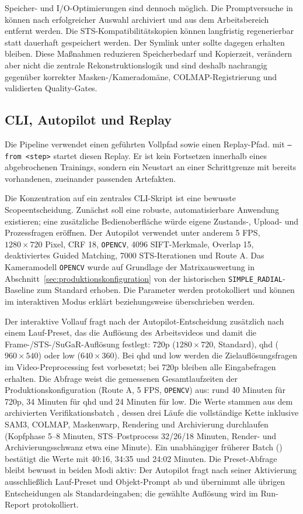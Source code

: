 Speicher- und I/O-Optimierungen sind dennoch möglich. Die Promptversuche in
 können nach erfolgreicher Auswahl archiviert und aus dem
Arbeitsbereich entfernt werden. Die STS-Kompatibilitätskopien können langfristig
regenerierbar statt dauerhaft gespeichert werden. Der Symlink unter
 sollte dagegen erhalten bleiben. Diese Maßnahmen
reduzieren Speicherbedarf und Kopierzeit, verändern aber nicht die zentrale
Rekonstruktionslogik und sind deshalb nachrangig gegenüber korrekter
Masken-/Kameradomäne, COLMAP-Registrierung und validierten Quality-Gates.

\subsection{CLI, Autopilot und Replay}

Die Pipeline verwendet einen geführten Vollpfad sowie einen Replay-Pfad.
 mit \texttt{--from <step>} startet diesen Replay. Er
ist kein Fortsetzen innerhalb eines abgebrochenen Trainings, sondern ein
Neustart an einer
Schrittgrenze mit bereits vorhandenen, zueinander passenden Artefakten.

Die Konzentration auf ein zentrales CLI-Skript ist eine bewusste
Scopeentscheidung. Zunächst soll eine robuste, automatisierbare Anwendung
existieren; eine zusätzliche Bedienoberfläche würde eigene Zustands-, Upload-
und Prozessfragen eröffnen. Der Autopilot verwendet unter anderem 5 FPS,
$1280\times720$ Pixel, CRF 18, \texttt{OPENCV}, 4096 SIFT-Merkmale,
Overlap 15, deaktiviertes Guided Matching, 7000 STS-Iterationen und Route A.
Das Kameramodell \texttt{OPENCV} wurde auf Grundlage der Matrixauswertung in
Abschnitt~\ref{sec:produktionskonfiguration} von der historischen
\texttt{SIMPLE\_RADIAL}-Baseline zum Standard erhoben. Die Parameter werden
protokolliert und können im interaktiven Modus erklärt beziehungsweise
überschrieben werden.

Der interaktive Vollauf fragt nach der Autopilot-Entscheidung zusätzlich nach
einem Lauf-Preset, das die Auflösung des Arbeitsvideos und damit die
Frame-/STS-/SuGaR-Auflösung festlegt: 720p ($1280\times720$, Standard),
qhd ($960\times540$) oder low ($640\times360$). Bei qhd und low werden die
Zielauflösungsfragen im Video-Preprocessing fest vorbesetzt; bei 720p bleiben
alle Eingabefragen erhalten. Die Abfrage weist die gemessenen Gesamtlaufzeiten
der Produktionskonfiguration (Route A, 5 FPS,
\texttt{OPENCV}) aus: rund 40 Minuten für 720p, 34 Minuten für qhd und
24 Minuten für low. Die Werte stammen aus dem archivierten
Verifikationsbatch , dessen drei Läufe
die vollständige Kette inklusive SAM3, COLMAP, Maskenwarp, Rendering und
Archivierung durchlaufen (Kopfphase 5--8 Minuten, STS--Postprocess
32/26/18 Minuten, Render- und Archivierungsschwanz etwa eine Minute). Ein
unabhängiger früherer Batch ()
bestätigt die Werte mit 40:16, 34:35 und 24:02 Minuten. Die
Preset-Abfrage bleibt bewusst in beiden Modi
aktiv: Der Autopilot fragt nach seiner Aktivierung ausschließlich Lauf-Preset
und Objekt-Prompt ab und übernimmt alle übrigen Entscheidungen als
Standardeingaben; die gewählte Auflösung wird im Run-Report protokolliert.

